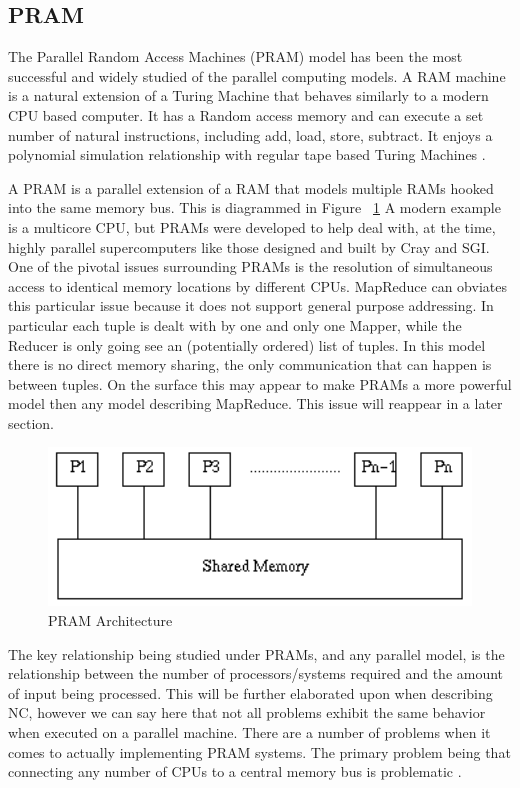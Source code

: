 \documentclass{article}
\begin{document}
\subsection{PRAM}
The Parallel Random Access Machines (PRAM) model has been the most successful and widely studied of the parallel computing models. A RAM machine is a natural extension of a Turing Machine that behaves similarly to a modern CPU based computer. It has a Random access memory and can execute a set number of natural instructions, including add, load, store, subtract. It enjoys a polynomial simulation relationship with regular tape based Turing Machines \cite{ram}.

A PRAM is a parallel extension of a RAM that models multiple RAMs hooked into the same memory bus. This is diagrammed in Figure ~\ref{fig:pram} A modern example is a multicore CPU, but PRAMs were developed to help deal with, at the time, highly parallel supercomputers like those designed and built by Cray and SGI. One of the pivotal issues surrounding PRAMs is the resolution of simultaneous access to identical memory locations by different CPUs. MapReduce can obviates this particular issue because it does not support general purpose addressing. In particular each tuple is dealt with by one and only one Mapper, while the Reducer is only going see an (potentially ordered) list of tuples. In this model there is no direct memory sharing, the only communication that can happen is between tuples. On the surface this may appear to make PRAMs a more powerful model then any model describing MapReduce. This issue will reappear in a later section. 

\begin{figure}[h]
\begin{center}
\includegraphics[width=120mm]{reportpram.png}
\caption{PRAM Architecture}
\label{fig:pram}
\end{center}
\end{figure}

The key relationship being studied under PRAMs, and any parallel model, is the relationship between the number of processors/systems required and the amount of input being processed. This will be further elaborated upon when describing NC, however we can say here that not all problems exhibit the same behavior when executed on a parallel machine. There are a number of problems when it comes to actually implementing PRAM systems. The primary problem being that connecting any number of CPUs to a central memory bus is problematic \cite{pram}. 
\end{document}
